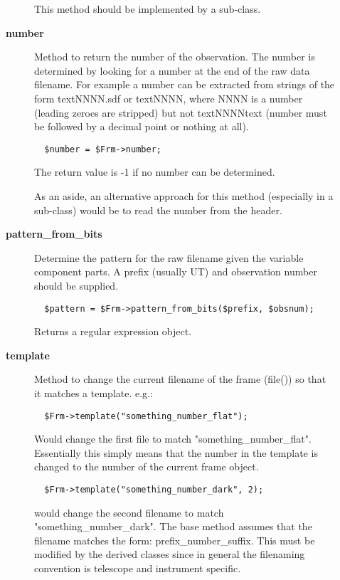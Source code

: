 \begin{description}
\begin{description}
This method should be implemented by a sub-class.


\item[{\textbf{number}}] \mbox{}

Method to return the number of the observation. The number is
determined by looking for a number at the end of the raw data
filename.  For example a number can be extracted from strings of the
form textNNNN.sdf or textNNNN, where NNNN is a number (leading zeroes
are stripped) but not textNNNNtext (number must be followed by a decimal
point or nothing at all).

\begin{verbatim}
  $number = $Frm->number;
\end{verbatim}


The return value is -1 if no number can be determined.



As an aside, an alternative approach for this method (especially
in a sub-class) would be to read the number from the header.


\item[{\textbf{pattern\_from\_bits}}] \mbox{}

Determine the pattern for the raw filename given the variable component
parts. A prefix (usually UT) and observation number should
be supplied.

\begin{verbatim}
  $pattern = $Frm->pattern_from_bits($prefix, $obsnum);
\end{verbatim}


Returns a regular expression object.


\item[{\textbf{template}}] \mbox{}

Method to change the current filename of the frame (file())
so that it matches a template. e.g.:

\begin{verbatim}
  $Frm->template("something_number_flat");
\end{verbatim}


Would change the first file to match "something\_number\_flat".
Essentially this simply means that the number in the template
is changed to the number of the current frame object.

\begin{verbatim}
  $Frm->template("something_number_dark", 2);
\end{verbatim}


would change the second filename to match "something\_number\_dark".
The base method assumes that the filename matches the form:
prefix\_number\_suffix. This must be modified by the derived
classes since in general the filenaming convention is telescope
and instrument specific.




\end{description}
\end{description}
